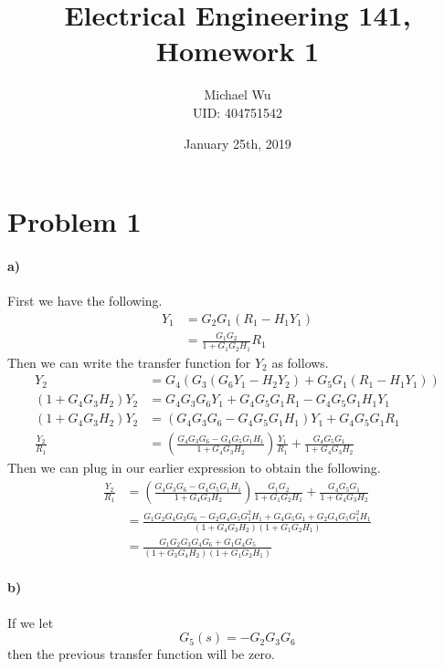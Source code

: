 \documentclass[12pt]{article}
\begin{document}
\title{Electrical Engineering 141, Homework 1}
\date{January 25th, 2019}
\author{Michael Wu\\UID: 404751542}
\maketitle

\section*{Problem 1}

\paragraph{a)}

First we have the following.
\begin{align*}
    Y_1 &= G_2G_1(R_1 - H_1Y_1)\\
    &=\frac{G_1G_2}{1+G_1G_2H_1}R_1
\end{align*}
Then we can write the transfer function for \(Y_2\) as follows.
\begin{align*}
    Y_2 &= G_4(G_3(G_6Y_1-H_2Y_2)+ G_5G_1(R_1-H_1Y_1))\\
    (1+G_4G_3H_2)Y_2&=G_4G_3G_6Y_1+ G_4G_5G_1R_1-G_4G_5G_1H_1Y_1\\
    (1+G_4G_3H_2)Y_2&=(G_4G_3G_6-G_4G_5G_1H_1)Y_1+ G_4G_5G_1R_1\\
    \frac{Y_2}{R_1}&=\left(\frac{G_4G_3G_6-G_4G_5G_1H_1}{1+G_4G_3H_2}\right)\frac{Y_1}{R_1} + \frac{G_4G_5G_1}{1+G_4G_3H_2}
\end{align*}
Then we can plug in our earlier expression to obtain the following.
\begin{align*}
    \frac{Y_2}{R_1}&=\left(\frac{G_4G_3G_6-G_4G_5G_1H_1}{1+G_4G_3H_2}\right)\frac{G_1G_2}{1+G_1G_2H_1}+\frac{G_4G_5G_1}{1+G_4G_3H_2}\\
    &=\frac{G_1G_2G_4G_3G_6-G_2G_4G_5G_1^2H_1 + G_4G_5G_1 + G_2G_4G_5G_1^2H_1}{(1+G_4G_3H_2)(1+G_1G_2H_1)}\\
    &=\frac{G_1G_2G_3G_4G_6 + G_1G_4G_5}{(1+G_3G_4H_2)(1+G_1G_2H_1)}
\end{align*}

\paragraph{b)}

If we let
\[G_5(s)=-G_2G_3G_6\]
then the previous transfer function will be zero.
\end{document}
